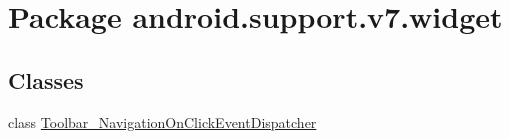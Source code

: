 \hypertarget{namespaceandroid_1_1support_1_1v7_1_1widget}{
\section{Package android.support.v7.widget}
\label{namespaceandroid_1_1support_1_1v7_1_1widget}
}
\subsection*{Classes}
\begin{CompactItemize}
\item 
class \hyperlink{classandroid_1_1support_1_1v7_1_1widget_1_1_toolbar___navigation_on_click_event_dispatcher}{Toolbar\_\-NavigationOnClickEventDispatcher}
\end{CompactItemize}
